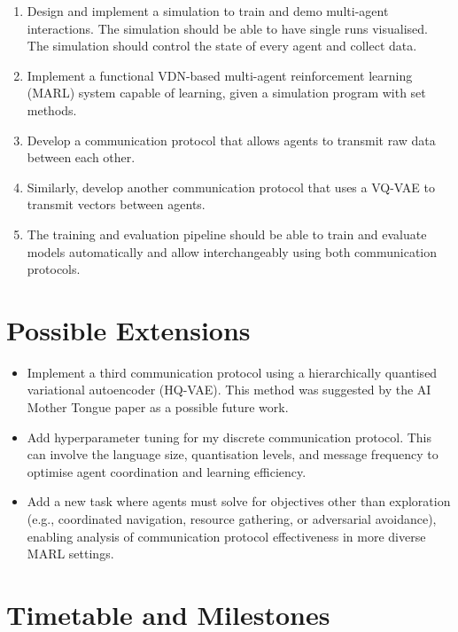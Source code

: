 \documentclass[20pt]{article}
\begin{document}
\begin{enumerate}
\item Design and implement a simulation to train and demo multi-agent interactions. The simulation should be able to have single runs visualised. The simulation should control the state of every agent and collect data.
\item Implement a functional VDN-based multi-agent reinforcement learning (MARL) system capable of learning, given a simulation program with set methods.
\item Develop a communication protocol that allows agents to transmit raw data between each other.
\item Similarly, develop another communication protocol that uses a VQ-VAE  to transmit vectors between agents.
\item The training and evaluation pipeline should be able to train and evaluate models automatically and allow interchangeably using both communication protocols.
\end{enumerate}


\section{Possible Extensions}

\begin{itemize}
\item Implement a third communication protocol using a hierarchically quantised variational autoencoder (HQ-VAE). This method was suggested by the AI Mother Tongue paper as a possible future work.
\item Add hyperparameter tuning for my discrete communication protocol. This can involve the language size, quantisation levels, and message frequency to optimise agent coordination and learning efficiency.
\item Add a new task where agents must solve for objectives other than exploration (e.g., coordinated navigation, resource gathering, or adversarial avoidance), enabling analysis of communication protocol effectiveness in more diverse MARL settings.
\end{itemize}

\pagebreak

\section{Timetable and Milestones}
\end{document}
